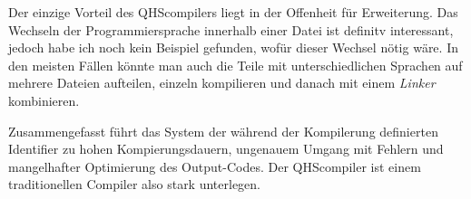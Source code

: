 Der einzige Vorteil des QHScompilers liegt in der Offenheit für Erweiterung.
Das Wechseln der Programmiersprache innerhalb einer Datei ist definitv interessant, jedoch habe ich noch kein Beispiel gefunden, wofür dieser Wechsel nötig wäre.
In den meisten Fällen könnte man auch die Teile mit unterschiedlichen Sprachen auf mehrere Dateien aufteilen, einzeln kompilieren und danach mit einem \textit{Linker} kombinieren.

Zusammengefasst führt das System der während der Kompilerung definierten Identifier zu hohen Kompierungsdauern, ungenauem Umgang mit Fehlern und mangelhafter Optimierung des Output-Codes.
Der QHScompiler ist einem traditionellen Compiler also stark unterlegen.
